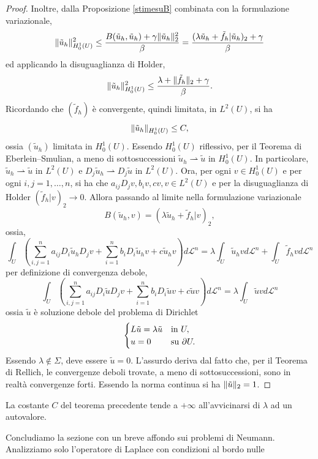 \begin{proof}
	Inoltre, dalla Proposizione \eqref{stimesuB} combinata con la formulazione variazionale,
	\[ \lVert\tilde{u}_h\rVert_{H^1_0(U)}^2 \le \dfrac{B(\tilde{u}_h,\tilde{u}_h)+\gamma\lVert\tilde{u}_h\rVert_{2}^2}{\beta} =  \frac{(\lambda\tilde{u}_h+\tilde{f}_h|\tilde{u}_h)_2 + \gamma}{\beta}\]
	ed applicando la disuguaglianza di Holder, 
	\[ \lVert\tilde{u}_h\rVert_{H^1_0(U)}^2 \le \frac{\lambda + \lVert\tilde{f}_h\rVert_2 + \gamma}{\beta}.\]
	Ricordando che $(\tilde{f}_h)$ è convergente, quindi limitata, in $L^2(U)$, si ha
	\[ \lVert\tilde{u}_h\rVert_{H^1_0(U)} \le C, \]
	ossia $(\tilde{u}_h)$ limitata in $H^1_0(U)$. Essendo $H^1_0(U)$ riflessivo, per il Teorema di Eberlein--Smulian, a meno di sottosuccessioni $\tilde{u}_h \rightharpoonup \tilde{u} $ in $H^1_0(U)$. In particolare,  $\tilde{u}_h \rightharpoonup  \tilde{u}$ in $L^2(U)$ e $D_j\tilde{u}_h \rightharpoonup D_j \tilde{u}$ in $L^2(U)$. Ora, per ogni $v \in H^1_0(U)$ e per ogni $i,j=1,\dots, n$, si ha che $a_{ij}D_jv, b_iv, cv, v \in L^2(U)$ e per la disuguaglianza di Holder $(\tilde{f}_h|v)_2 \to 0$. Allora passando al limite nella formulazione variazionale
	\[ B(\tilde{u}_h,v) = (\lambda\tilde{u}_h +\tilde{f}_h|v)_2, \]
	ossia, 
	\[  \int_U \left( \sum_{i,j=1}^{n}a_{ij}D_i\tilde{u}_hD_{j}v + \sum_{i=1}^{n}b_i D_i\tilde{u}_hv + c\tilde{u}_hv\right) d\mathcal{L}^n = \lambda \int_U \tilde{u}_h v d\mathcal{L}^n + \int_U \tilde{f}_h v d\mathcal{L}^n\]
	per definizione di convergenza debole,
	\[  \int_U \left( \sum_{i,j=1}^{n}a_{ij}D_i\tilde{u}D_{j}v + \sum_{i=1}^{n}b_i D_i\tilde{u}v + c\tilde{u}v\right) d\mathcal{L}^n = \lambda \int_U \tilde{u} v d\mathcal{L}^n\]
	ossia $\tilde{u}$ è soluzione debole del problema di Dirichlet
	\[ \begin{cases}
		L\tilde{u} = \lambda \tilde{u} & \textup{in } U,\\
		u = 0 & \textup{su } \partial U.
	\end{cases} \]
	Essendo $\lambda \notin \Sigma$, deve essere $\tilde{u} = 0$. L'assurdo deriva dal fatto che, per il Teorema di Rellich, le convergenze deboli trovate, a meno di sottosuccessioni, sono in realtà convergenze forti. Essendo la norma continua si ha $\lVert\tilde{u}\rVert_2 = 1$.
\end{proof}
\begin{osservazione}
	La costante $C$ del teorema precedente tende a $+\infty$ all'avvicinarsi di $\lambda$ ad un autovalore.
\end{osservazione}
Concludiamo la sezione con un breve affondo sui problemi di Neumann. Analizziamo solo l'operatore di Laplace con condizioni al bordo nulle
